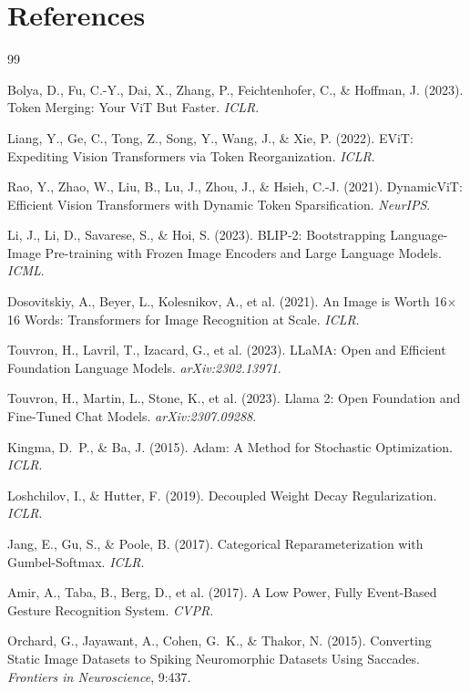 \documentclass{article}
\begin{document}
\section*{References}
\medskip

{\small
\begin{thebibliography}{99}

Bolya, D., Fu, C.-Y., Dai, X., Zhang, P., Feichtenhofer, C., \& Hoffman, J. (2023). Token Merging: Your ViT But Faster. \emph{ICLR}.

Liang, Y., Ge, C., Tong, Z., Song, Y., Wang, J., \& Xie, P. (2022). EViT: Expediting Vision Transformers via Token Reorganization. \emph{ICLR}.

Rao, Y., Zhao, W., Liu, B., Lu, J., Zhou, J., \& Hsieh, C.-J. (2021). DynamicViT: Efficient Vision Transformers with Dynamic Token Sparsification. \emph{NeurIPS}.

Li, J., Li, D., Savarese, S., \& Hoi, S. (2023). BLIP-2: Bootstrapping Language-Image Pre-training with Frozen Image Encoders and Large Language Models. \emph{ICML}.

Dosovitskiy, A., Beyer, L., Kolesnikov, A., et al. (2021). An Image is Worth 16$\times$16 Words: Transformers for Image Recognition at Scale. \emph{ICLR}.

Touvron, H., Lavril, T., Izacard, G., et al. (2023). LLaMA: Open and Efficient Foundation Language Models. \emph{arXiv:2302.13971}.

Touvron, H., Martin, L., Stone, K., et al. (2023). Llama 2: Open Foundation and Fine-Tuned Chat Models. \emph{arXiv:2307.09288}.

Kingma, D.~P., \& Ba, J. (2015). Adam: A Method for Stochastic Optimization. \emph{ICLR}.

Loshchilov, I., \& Hutter, F. (2019). Decoupled Weight Decay Regularization. \emph{ICLR}.

Jang, E., Gu, S., \& Poole, B. (2017). Categorical Reparameterization with Gumbel-Softmax. \emph{ICLR}.

Amir, A., Taba, B., Berg, D., et al. (2017). A Low Power, Fully Event-Based Gesture Recognition System. \emph{CVPR}.

Orchard, G., Jayawant, A., Cohen, G.~K., \& Thakor, N. (2015). Converting Static Image Datasets to Spiking Neuromorphic Datasets Using Saccades. \emph{Frontiers in Neuroscience}, 9:437.


\end{thebibliography}}
\end{document}

